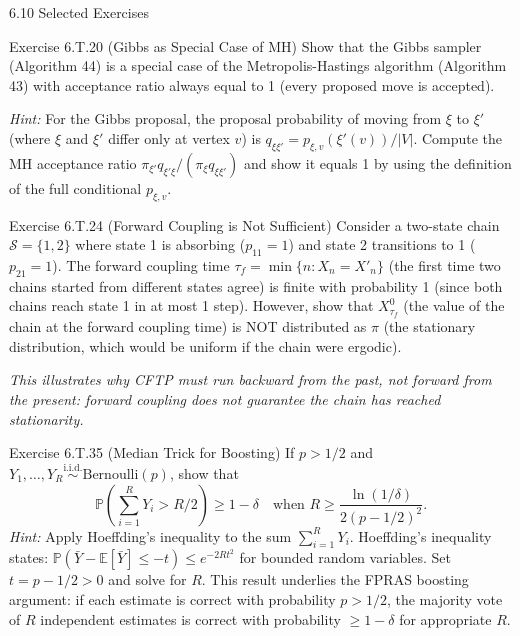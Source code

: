 \documentclass[aspectratio=169,10pt]{beamer}
\newcommand{\PP}{\mathbb{P}}
\newcommand{\EE}{\mathbb{E}}
\begin{document}
\begin{frame}[allowframebreaks]{6.10 Selected Exercises}
\begin{block}{Exercise 6.T.20 (Gibbs as Special Case of MH)}
Show that the Gibbs sampler (Algorithm 44) is a special case of the Metropolis-Hastings algorithm (Algorithm 43) with acceptance ratio always equal to 1 (every proposed move is accepted).

\textit{Hint:} For the Gibbs proposal, the proposal probability of moving from $\xi$ to $\xi'$ (where $\xi$ and $\xi'$ differ only at vertex $v$) is $q_{\xi\xi'} = p_{\xi,v}(\xi'(v))/|V|$.
Compute the MH acceptance ratio $\pi_{\xi'} q_{\xi'\xi} / (\pi_\xi q_{\xi\xi'})$ and show it equals 1 by using the definition of the full conditional $p_{\xi,v}$.
\end{block}

\begin{block}{Exercise 6.T.24 (Forward Coupling is Not Sufficient)}
Consider a two-state chain $\mathcal{S} = \{1,2\}$ where state 1 is absorbing ($p_{11} = 1$) and state 2 transitions to 1 ($p_{21} = 1$).
The forward coupling time $\tau_f = \min\{n : X_n = X'_n\}$ (the first time two chains started from different states agree) is finite with probability 1 (since both chains reach state 1 in at most 1 step).
However, show that $X_{\tau_f}^0$ (the value of the chain at the forward coupling time) is NOT distributed as $\pi$ (the stationary distribution, which would be uniform if the chain were ergodic).

\textit{This illustrates why CFTP must run backward from the past, not forward from the present: forward coupling does not guarantee the chain has reached stationarity.}
\end{block}

\begin{block}{Exercise 6.T.35 (Median Trick for Boosting)}
If $p > 1/2$ and $Y_1, \ldots, Y_R \overset{\text{i.i.d.}}{\sim} \mathrm{Bernoulli}(p)$, show that
\[
  \PP\!\left(\sum_{i=1}^R Y_i > R/2\right) \ge 1 - \delta \quad \text{when } R \ge \frac{\ln(1/\delta)}{2(p-1/2)^2}.
\]
\textit{Hint:} Apply Hoeffding's inequality to the sum $\sum_{i=1}^R Y_i$.
Hoeffding's inequality states: $\PP(\bar{Y} - \EE[\bar{Y}] \le -t) \le e^{-2R t^2}$ for bounded random variables.
Set $t = p - 1/2 > 0$ and solve for $R$.
This result underlies the FPRAS boosting argument: if each estimate is correct with probability $p > 1/2$, the majority vote of $R$ independent estimates is correct with probability $\ge 1 - \delta$ for appropriate $R$.
\end{block}

\end{frame}
\end{document}
